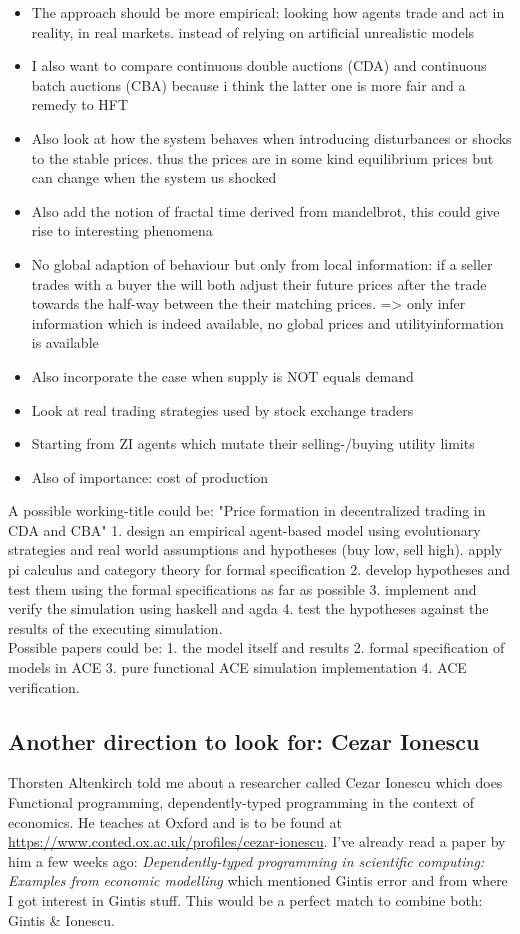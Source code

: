 \begin{itemize}
\item The approach should be more empirical: looking how agents trade and act in reality, in real markets. instead of relying on artificial unrealistic models
\item I also want to compare continuous double auctions (CDA) and continuous batch auctions (CBA) because i think the latter one is more fair and a remedy to HFT
\item Also look at how the system behaves when introducing disturbances or shocks to the stable prices. thus the prices are in some kind equilibrium prices but can change when the system us shocked
\item Also add the notion of fractal time derived from mandelbrot, this could give rise to interesting phenomena
\item No global adaption of behaviour but only from local information: if a seller trades with a buyer the will both adjust their future prices after the trade towards the half-way between the their matching prices. => only infer information which is indeed available, no global prices and utilityinformation is available
\item Also incorporate the case when supply is NOT equals demand
\item Look at real trading strategies used by stock exchange traders
\item Starting from ZI agents which mutate their selling-/buying utility limits
\item Also of importance: cost of production
\end{itemize}

A possible working-title could be: "Price formation in decentralized trading in CDA and CBA" 1. design an empirical agent-based model using evolutionary strategies and real world assumptions and hypotheses (buy low, sell high). apply pi calculus and category theory for formal specification 2. develop hypotheses and test them using the formal specifications as far as possible 3. implement and verify the simulation using haskell and agda 4. test the hypotheses against the results of the executing simulation. \\ Possible papers could be: 1. the model itself and results 2. formal specification of models in ACE 3. pure functional ACE simulation implementation 4. ACE verification.

\subsection*{Another direction to look for: Cezar Ionescu}
Thorsten Altenkirch told me about a researcher called Cezar Ionescu which does Functional programming, dependently-typed programming in the context of economics. He teaches at Oxford and is to be found at \url{https://www.conted.ox.ac.uk/profiles/cezar-ionescu}. I've already read a paper by him a few weeks ago: \textit{Dependently-typed programming in scientific computing: Examples from economic modelling} which mentioned Gintis error and from where I got interest in Gintis stuff. This would be a perfect match to combine both: Gintis \& Ionescu.